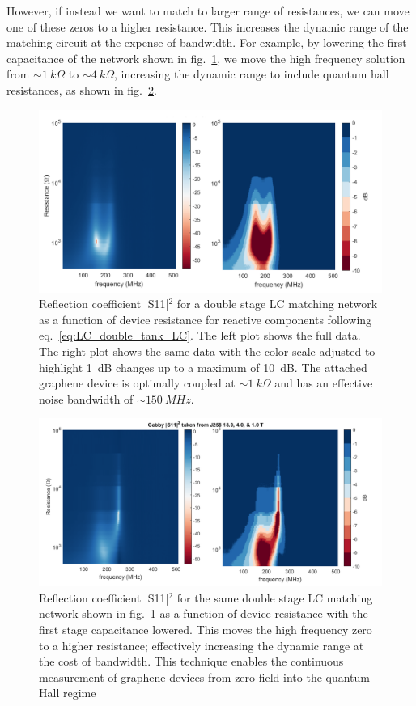 However, if instead we want to match to larger range of resistances, we can move one of these zeros to a higher resistance. This increases the dynamic range of the matching circuit at the expense of bandwidth. For example, by lowering the first capacitance of the network shown in fig.~\ref{fig:S11vsR_double}, we move the high frequency solution from ${\sim}1~k\Omega$ to ${\sim}4~k\Omega$, increasing the dynamic range to include quantum hall resistances, as shown in fig.~\ref{fig:S11vsR_double2}.
\begin{figure}
\centering
\includegraphics[width=\textwidth]{figures/Johnson_noise_thermometry/S11vsR_double.png}
\caption{Reflection coefficient |S11|$^2$ for a double stage LC matching network as a function of device resistance for reactive components following eq.~\ref{eq:LC_double_tank_LC}. The left plot shows the full data. The right plot shows the same data with the color scale adjusted to highlight 1~dB changes up to a maximum of 10~dB. The attached graphene device is optimally coupled at ${\sim}1~k\Omega$ and has an effective noise bandwidth of ${\sim}150~MHz$.}
\label{fig:S11vsR_double}
\end{figure}
\begin{figure}
\centering
\includegraphics[width=\textwidth]{figures/Johnson_noise_thermometry/S11vsR_double2.png}
\caption{Reflection coefficient |S11|$^2$ for the same  double stage LC matching network shown in fig.~\ref{fig:S11vsR_double} as a function of device resistance with the first stage capacitance lowered. This moves the high frequency zero to a higher resistance; effectively increasing the dynamic range at the cost of bandwidth. This technique enables the continuous measurement of graphene devices from zero field into the quantum Hall regime}
\label{fig:S11vsR_double2}
\end{figure}


